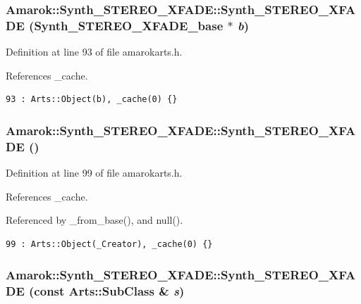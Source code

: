 \subsubsection{\setlength{\rightskip}{0pt plus 5cm}Amarok::Synth\_\-STEREO\_\-XFADE::Synth\_\-STEREO\_\-XFADE ({\bf Synth\_\-STEREO\_\-XFADE\_\-base} $\ast$ {\em b})\hspace{0.3cm}{\tt  [inline, protected]}}\label{classAmarok_1_1Synth__STEREO__XFADE_Amarok_1_1Synth__STEREO__XFADEb0}




Definition at line 93 of file amarokarts.h.

References \_\-cache.



\footnotesize\begin{verbatim}93 : Arts::Object(b), _cache(0) {}
\end{verbatim}\normalsize 
{}
\subsubsection{\setlength{\rightskip}{0pt plus 5cm}Amarok::Synth\_\-STEREO\_\-XFADE::Synth\_\-STEREO\_\-XFADE ()\hspace{0.3cm}{\tt  [inline]}}\label{classAmarok_1_1Synth__STEREO__XFADE_Amarok_1_1Synth__STEREO__XFADEa0}




Definition at line 99 of file amarokarts.h.

References \_\-cache.

Referenced by \_\-from\_\-base(), and null().



\footnotesize\begin{verbatim}99 : Arts::Object(_Creator), _cache(0) {}
\end{verbatim}\normalsize 
{}
\subsubsection{\setlength{\rightskip}{0pt plus 5cm}Amarok::Synth\_\-STEREO\_\-XFADE::Synth\_\-STEREO\_\-XFADE (const Arts::Sub\-Class \& {\em s})\hspace{0.3cm}{\tt  [inline]}}\label{classAmarok_1_1Synth__STEREO__XFADE_Amarok_1_1Synth__STEREO__XFADEa1}




